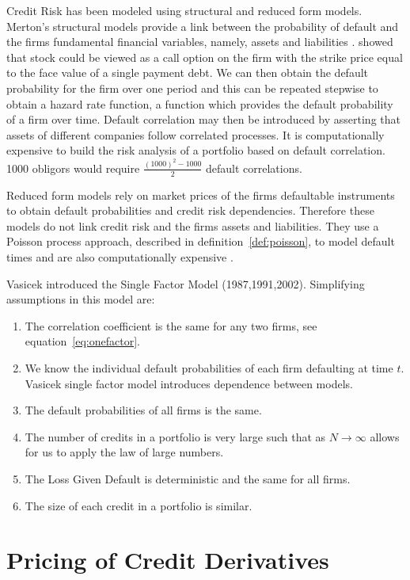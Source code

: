 Credit Risk has been modeled using structural and reduced form models.
Merton's structural models provide a link between the probability of default and the firms 
fundamental financial variables, namely, assets and liabilities \cite{Eli2006}. \cite{mer1974} showed that stock could be viewed as a call option on the firm with the strike price equal to the face value of a single payment debt.
We can then obtain the default probability for the firm over one period and this can be repeated stepwise to obtain a hazard rate function, a function which provides the default probability of a firm over time. Default correlation may then be introduced by asserting that assets of different companies follow correlated processes. It is computationally expensive to build the risk analysis of a portfolio based on default correlation.  1000 obligors would require $\frac{(1000)^2 - 1000}{2}$ default correlations.

Reduced form models rely on market prices of the firms defaultable instruments to obtain default probabilities and credit risk dependencies. Therefore these models do not link credit risk and the firms assets and liabilities. They use a Poisson process approach, described in definition~\ref{def:poisson}, to model default times and are also computationally expensive \cite{ds1999}.


Vasicek introduced the Single Factor Model (1987,1991,2002). Simplifying assumptions
in this model \cite{Eli2006} are:
\begin{enumerate}
\item The correlation coefficient is the same for any two firms, see equation~\ref{eq:onefactor}.
\item We know the individual default probabilities of each firm defaulting at time $t$. Vasicek single factor model introduces dependence between models.
\item The default probabilities of all firms is the same.
\item The number of credits in a portfolio is very large such that as $N \to \infty$ allows for us to apply the law of large numbers.
\item The Loss Given Default is deterministic and the same for all firms.
\item The size of each credit in a portfolio is similar.
\end{enumerate}




\section{Pricing of Credit Derivatives}

